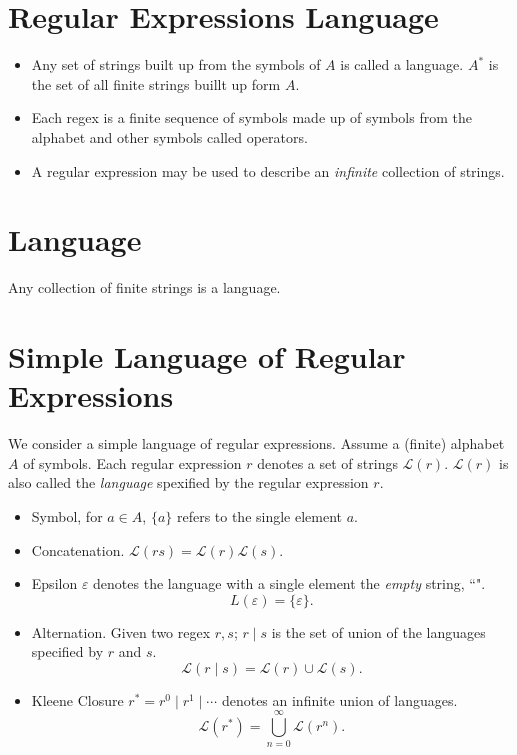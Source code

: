 \documentclass[a4paper]{scrartcl}
\theoremstyle{definition}
\newcommand{\eps}{\varepsilon}
\begin{document}
\section{Regular Expressions Language}
\begin{itemize}
	\item Any set of strings built up from the symbols of $A$ is called a language. $A^*$ is the set of all finite strings buillt up form $A$.
	\item Each regex is a finite sequence of symbols made up of symbols from the alphabet and other symbols called operators.
	\item A regular expression may be used to describe an \emph{infinite} collection of strings.
\end{itemize}

\section{Language}
Any collection of finite strings is a language.

\section{Simple Language of Regular Expressions}
We consider a simple language of regular expressions. Assume a (finite) alphabet $A$ of symbols. Each regular expression $r$ denotes a set of strings $\mathcal L(r)$. $\mathcal L(r)$ is also called the \emph{language} spexified by the regular expression $r$.
\begin{itemize}
	\item Symbol, for $a \in A$, $\{a\}$ refers to the single element $a$.
	\item Concatenation. $\mathcal{L}(rs) = \mathcal{L}(r)\mathcal{L}(s)$.
	\item Epsilon $\eps$ denotes the language with a single element the \emph{empty} string, ``\;".
		\[L(\eps) = \{\eps\}.\]
	\item Alternation. Given two regex $r, s$; $r \mid s$ is the set of union of the languages specified by $r$ and $s$.
		\[\mathcal{L}(r \mid s) = \mathcal{L}(r) \cup \mathcal{L}(s).\]
	\item Kleene Closure $r^* = r^0 \mid r^1 \mid \cdots$ denotes an infinite union of languages.
		\[\mathcal{L}(r^*) = \bigcup_{n = 0}^{\infty} \mathcal{L}(r^n).\]
\end{itemize}
\end{document}
